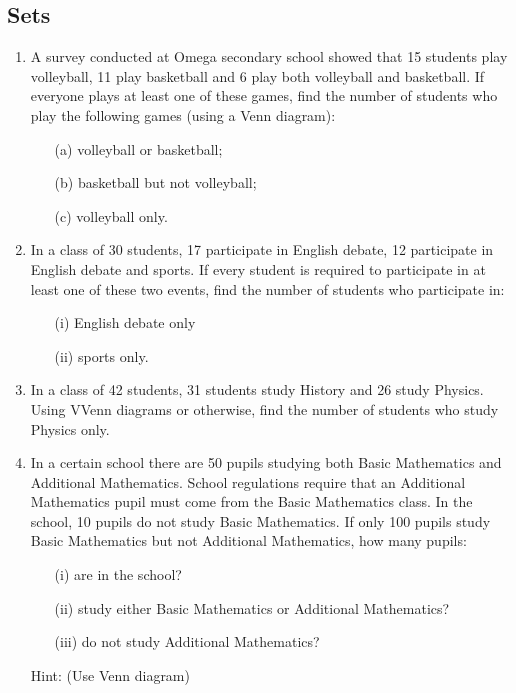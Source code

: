 	\subsection{Sets}
\begin{enumerate}

	\item A survey conducted at Omega secondary school showed that 15 students play volleyball, 11 play basketball and 6 play both volleyball and basketball. If everyone plays at least one of these games, find the number of students who play the following games (using a Venn diagram):
		\begin{itemize}
		\item[(a)] volleyball or basketball;
		\item[(b)] basketball but not volleyball;
		\item[(c)] volleyball only.
		\end{itemize}

	\item In a class of 30 students, 17 participate in English debate, 12 participate in English debate and sports. If every student is required to participate in at least one of these two events, find the number of students who participate in:
	\begin{itemize}
	\item[(i)] English debate only
	\item[(ii)] sports only.
	\end{itemize}

	\item In a class of 42 students, 31 students study History and 26 study Physics. Using VVenn diagrams or otherwise, find the number of students who study Physics only.
	
	\item In a certain school there are 50 pupils studying both Basic Mathematics and Additional Mathematics. School regulations require that an Additional Mathematics pupil must come from the Basic Mathematics class. In the school, 10 pupils do not study Basic Mathematics. If only 100 pupils study Basic Mathematics but not Additional Mathematics, how many pupils:
	\begin{itemize}
	\item[(i)] are in the school?
	\item[(ii)] study either Basic Mathematics or Additional Mathematics?
	\item[(iii)] do not study Additional Mathematics?
	\end{itemize}
	\noindent Hint: (Use Venn diagram)
	

\end{enumerate}
